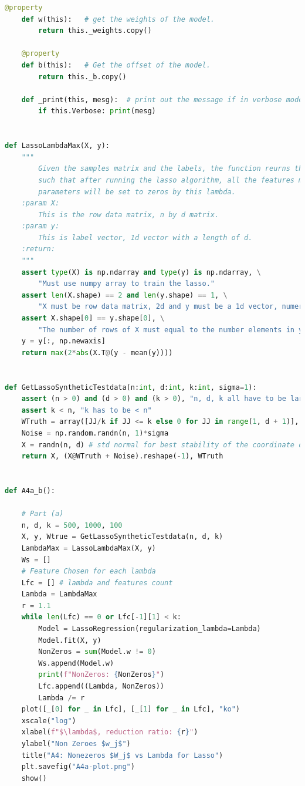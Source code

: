 \documentclass[]{article}
\begin{document}
\begin{lstlisting}[language=python]
    @property
    def w(this):   # get the weights of the model.
        return this._weights.copy()

    @property
    def b(this):   # Get the offset of the model.
        return this._b.copy()

    def _print(this, mesg):  # print out the message if in verbose mode.
        if this.Verbose: print(mesg)


def LassoLambdaMax(X, y):
    """
        Given the samples matrix and the labels, the function reurns the minimal lambda
        such that after running the lasso algorithm, all the features model
        parameters will be set to zeros by this lambda.
    :param X:
        This is the row data matrix, n by d matrix.
    :param y:
        This is label vector, 1d vector with a length of d.
    :return:
    """
    assert type(X) is np.ndarray and type(y) is np.ndarray, \
        "Must use numpy array to train the lasso."
    assert len(X.shape) == 2 and len(y.shape) == 1, \
        "X must be row data matrix, 2d and y must be a 1d vector, numerical."
    assert X.shape[0] == y.shape[0], \
        "The number of rows of X must equal to the number elements in y. "
    y = y[:, np.newaxis]
    return max(2*abs(X.T@(y - mean(y))))


def GetLassoSyntheticTestdata(n:int, d:int, k:int, sigma=1):
    assert (n > 0) and (d > 0) and (k > 0), "n, d, k all have to be larger than zeros"
    assert k < n, "k has to be < n"
    WTruth = array([JJ/k if JJ <= k else 0 for JJ in range(1, d + 1)], dtype=np.float)[:, np.newaxis]
    Noise = np.random.randn(n, 1)*sigma
    X = randn(n, d) # std normal for best stability of the coordinate descend algorithm.
    return X, (X@WTruth + Noise).reshape(-1), WTruth


def A4a_b():

    # Part (a)
    n, d, k = 500, 1000, 100
    X, y, Wtrue = GetLassoSyntheticTestdata(n, d, k)
    LambdaMax = LassoLambdaMax(X, y)
    Ws = []
    # Feature Chosen for each lambda
    Lfc = [] # lambda and features count
    Lambda = LambdaMax
    r = 1.1
    while len(Lfc) == 0 or Lfc[-1][1] < k:
        Model = LassoRegression(regularization_lambda=Lambda)
        Model.fit(X, y)
        NonZeros = sum(Model.w != 0)
        Ws.append(Model.w)
        print(f"NonZeros: {NonZeros}")
        Lfc.append((Lambda, NonZeros))
        Lambda /= r
    plot([_[0] for _ in Lfc], [_[1] for _ in Lfc], "ko")
    xscale("log")
    xlabel(f"$\lambda$, reduction ratio: {r}")
    ylabel("Non Zeroes $w_j$")
    title("A4: Nonezeros $W_j$ vs Lambda for Lasso")
    plt.savefig("A4a-plot.png")
    show()



\end{lstlisting}
\end{document}
